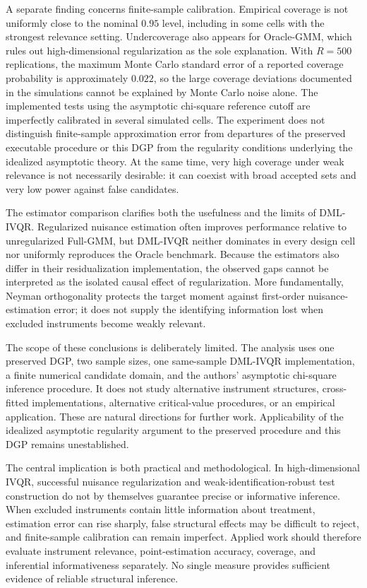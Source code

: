 A separate finding concerns finite-sample calibration. Empirical coverage is not uniformly close to the nominal $0.95$ level, including in some cells with the strongest relevance setting. Undercoverage also appears for Oracle-GMM, which rules out high-dimensional regularization as the sole explanation. With $R=500$ replications, the maximum Monte Carlo standard error of a reported coverage probability is approximately $0.022$, so the large coverage deviations documented in the simulations cannot be explained by Monte Carlo noise alone. The implemented tests using the asymptotic chi-square reference cutoff are imperfectly calibrated in several simulated cells. The experiment does not distinguish finite-sample approximation error from departures of the preserved executable procedure or this DGP from the regularity conditions underlying the idealized asymptotic theory. At the same time, very high coverage under weak relevance is not necessarily desirable: it can coexist with broad accepted sets and very low power against false candidates.

The estimator comparison clarifies both the usefulness and the limits of DML-IVQR. Regularized nuisance estimation often improves performance relative to unregularized Full-GMM, but DML-IVQR neither dominates in every design cell nor uniformly reproduces the Oracle benchmark. Because the estimators also differ in their residualization implementation, the observed gaps cannot be interpreted as the isolated causal effect of regularization. More fundamentally, Neyman orthogonality protects the target moment against first-order nuisance-estimation error; it does not supply the identifying information lost when excluded instruments become weakly relevant.

The scope of these conclusions is deliberately limited. The analysis uses one preserved DGP, two sample sizes, one same-sample DML-IVQR implementation, a finite numerical candidate domain, and the authors’ asymptotic chi-square inference procedure. It does not study alternative instrument structures, cross-fitted implementations, alternative critical-value procedures, or an empirical application. These are natural directions for further work. Applicability of the idealized asymptotic regularity argument to the preserved procedure and this DGP remains unestablished.

The central implication is both practical and methodological. In high-dimensional IVQR, successful nuisance regularization and weak-identification-robust test construction do not by themselves guarantee precise or informative inference. When excluded instruments contain little information about treatment, estimation error can rise sharply, false structural effects may be difficult to reject, and finite-sample calibration can remain imperfect. Applied work should therefore evaluate instrument relevance, point-estimation accuracy, coverage, and inferential informativeness separately. No single measure provides sufficient evidence of reliable structural inference.

